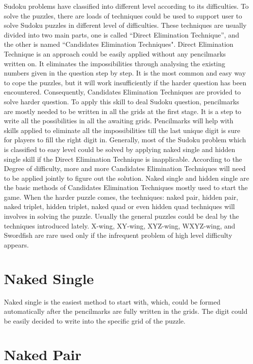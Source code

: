 \documentclass[11pt]{report}
\begin{document}
Sudoku problems have classified into different level according to its difficulties. To solve the puzzles, there are loads of techniques could be used to support user to solve Sudoku puzzles in different level of difficulties.
These techniques are usually divided into two main parts, one is called “Direct Elimination Technique”, and the other is named “Candidates Elimination Techniques".
Direct Elimination Technique is an approach could be easily applied without any pencilmarks written on. It eliminates the impossibilities through analysing the existing numbers given in the question step by step. It is the most common and easy way to cope the puzzles, but it will work insufficiently if the harder question has been encountered. 
Consequently, Candidates Elimination Techniques are provided to solve harder question. To apply this skill to deal Sudoku question, pencilmarks are mostly needed to be written in all the grids at the first stage. It is a step to write all the possibilities in all the awaiting grids. Pencilmarks will help with skills applied to eliminate all the impossibilities till the last unique digit is sure for players to fill the right digit in.
Generally, most of the Sudoku problem which is classified to easy level could be solved by applying naked single and hidden single skill if the Direct Elimination Technique is inapplicable. According to the Degree of difficulty, more and more Candidates Elimination Techniques will need to be applied jointly to figure out the solution. 
Naked single and hidden single are the basic methods of Candidates Elimination Techniques mostly used to start the game. When the harder puzzle comes, the techniques: naked pair, hidden pair, naked triplet, hidden triplet, naked quad or even hidden quad techniques will involves in solving the puzzle. Usually the general puzzles could be deal by the techniques introduced lately. X-wing, XY-wing, XYZ-wing, WXYZ-wing, and Swordfish are rare used only if the infrequent problem of high level difficulty appears. 

\section{Naked Single}
\label{sec:Naked Single}

Naked single is the easiest method to start with, which, could be formed automatically after the pencilmarks are fully written in the grids. The digit could be easily decided to write into the specific grid of the puzzle.

\section{Naked Pair}
\label{sec:Naked Pair}
\end{document}
